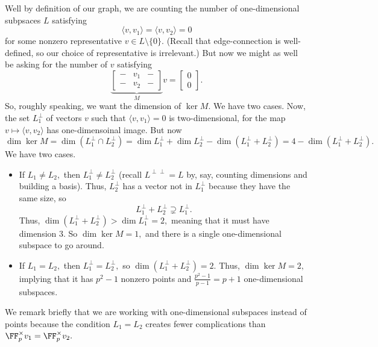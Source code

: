 Well by definition of our graph, we are counting the number of one-dimensional subpsaces $L$ satisfying
\[\langle v,v_1\rangle=\langle v,v_2\rangle=0\]
for some nonzero representative $v\in L\setminus\{0\}.$ (Recall that edge-connection is well-defined, so our choice of representative is irrelevant.) But now we might as well be asking for the number of $v$ satisfying
\[\underbrace{\begin{bmatrix}
    - & v_1 & - \\
    - & v_2 & -
\end{bmatrix}}_Mv=\begin{bmatrix}0 \\ 0\end{bmatrix}.\]
So, roughly speaking, we want the dimension of $\ker M.$ We have two cases. Now, the set $L_1^\perp$ of vectors $v$ such that $\langle v,v_1\rangle=0$ is two-dimensional, for the map $v\mapsto\langle v,v_2\rangle$ has one-dimensoinal image. But now
\[\dim\ker M=\dim(L_1^\perp\cap L_2^\perp)=\dim L_1^\perp+\dim L_2^\perp-\dim(L_1^\perp+L_2^\perp)=4-\dim(L_1^\perp+L_2^\perp).\]
We have two cases.
\begin{itemize}
    \item If $L_1\ne L_2,$ then $L_1^\perp\ne L_2^\perp$ (recall $L^{\perp\perp}=L$ by, say, counting dimensions and building a basis). Thus, $L_2^\perp$ has a vector not in $L_1^\perp$ because they have the same size, so
    \[L_1^\perp+L_2^\perp\supsetneq L_1^\perp.\]
    Thus, $\dim(L_1^\perp+L_2^\perp)>\dim L_1^\perp=2,$ meaning that it must have dimension $3.$ So $\dim\ker M=1,$ and there is a single one-dimensional subspace to go around.
    \item If $L_1=L_2,$ then $L_1^\perp=L_2^\perp,$ so $\dim(L_1^\perp+L_2^\perp)=2.$ Thus, $\dim\ker M=2,$ implying that it has $p^2-1$ nonzero points and $\frac{p^2-1}{p-1}=p+1$ one-dimensional subspaces.
\end{itemize}
We remark briefly that we are working with one-dimensional subspaces instead of points because the condition $L_1=L_2$ creates fewer complications than $\FF_p^\times v_1=\FF_p^\times v_2.$

